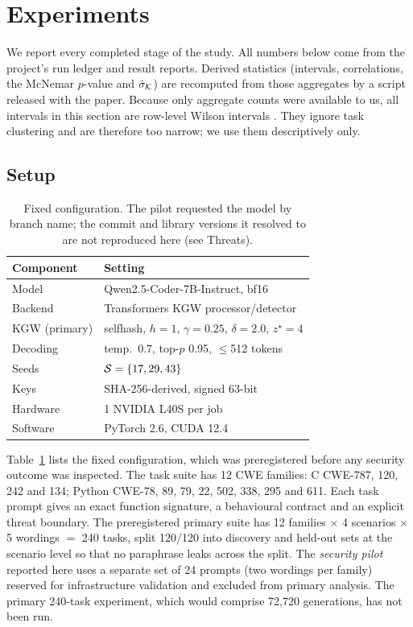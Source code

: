 \section{Experiments}
\label{sec:experiments}

We report every completed stage of the study. All numbers below come from the project's run ledger and result reports. Derived statistics (intervals, correlations, the McNemar $p$-value and $\hat\sigma_{\mathcal{K}}$) are recomputed from those aggregates by a script released with the paper. Because only aggregate counts were available to us, all intervals in this section are row-level Wilson intervals \citep{wilson1927probable}. They ignore task clustering and are therefore too narrow; we use them descriptively only.

\subsection{Setup}
\begin{table}[t]
\centering
\small
\begin{tabular}{@{}ll@{}}
\toprule
Component & Setting \\
\midrule
Model & Qwen2.5-Coder-7B-Instruct, bf16 \\
Backend & Transformers KGW processor/detector \\
KGW (primary) & selfhash, $h{=}1$, $\gamma{=}0.25$, $\delta{=}2.0$, $z^\star{=}4$ \\
Decoding & temp.\ 0.7, top-$p$ 0.95, $\le$512 tokens \\
Seeds & $\mathcal{S}=\{17,29,43\}$ \\
Keys & SHA-256-derived, signed 63-bit \\
Hardware & 1 NVIDIA L40S per job \\
Software & PyTorch 2.6, CUDA 12.4 \\
\bottomrule
\end{tabular}
\caption{Fixed configuration. The pilot requested the model by branch name; the commit and library versions it resolved to are not reproduced here (see Threats).}
\label{tab:setup}
\end{table}

Table~\ref{tab:setup} lists the fixed configuration, which was preregistered before any security outcome was inspected. The task suite has 12 CWE families: C CWE-787, 120, 242 and 134; Python CWE-78, 89, 79, 22, 502, 338, 295 and 611. Each task prompt gives an exact function signature, a behavioural contract and an explicit threat boundary. The preregistered primary suite has 12 families $\times$ 4 scenarios $\times$ 5 wordings $=$ 240 tasks, split 120/120 into discovery and held-out sets at the scenario level so that no paraphrase leaks across the split. The \emph{security pilot} reported here uses a separate set of 24 prompts (two wordings per family) reserved for infrastructure validation and excluded from primary analysis. The primary 240-task experiment, which would comprise 72,720 generations, has not been run.

